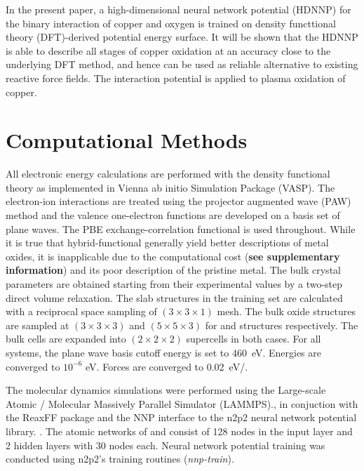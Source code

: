\message{ !name(paper.tex)}\documentclass[manuscript=cmatex]{achemso}
\begin{document}


In the present paper, a high-dimensional neural network potential (HDNNP) for the binary interaction of copper and oxygen is trained on density functtional theory (DFT)-derived potential energy surface. It will be shown that the HDNNP is able to describe all stages of copper oxidation at an accuracy close to the underlying DFT method, and hence can be used as reliable alternative to existing reactive force fields. The interaction potential is applied to plasma oxidation of copper.
\section{Computational Methods}
All electronic energy calculations are performed with the density functional theory as implemented in Vienna ab initio Simulation Package (VASP)\cite{VASP:1994,VASP:1996,Kresse:1996}. The electron-ion interactions are treated using the projector augmented wave (PAW) method\cite{VASP:1999} and the valence one-electron functions are developed on a basis set of plane waves. The PBE exchange-correlation functional\cite{PBE:1996} is used throughout. While it is true that hybrid-functional generally yield better descriptions of metal oxides, it is inapplicable due to the computational cost (\textbf{see supplementary information}) and its poor description of the pristine metal. The bulk crystal parameters are obtained starting from their experimental values\cite{CRC:97} by a two-step direct volume relaxation. The slab structures in the training set are calculated with a reciprocal space sampling of $(3\times3\times1)$ mesh. The bulk oxide structures are sampled at $(3\times3\times3)$ and $(5\times5\times3)$ for  and  structures respectively. The bulk cells are expanded into $(2\times2\times2)$ supercells in both cases. For all systems, the plane wave basis cutoff energy is set to \SI{460}{eV}. Energies are converged to $10^{-6}$ eV. Forces are converged to \SI{0.02}{eV/{\angstrom}}.

The molecular dynamics simulations were performed using the Large-scale Atomic / Molecular Massively Parallel Simulator (LAMMPS).\cite{thompson_lammps_2022}, in conjuction with the ReaxFF package\cite{aktulga_parallel_2012} and the NNP interface to the n2p2 neural network potential library. \cite{singraber_library-based_2019}. The atomic networks of  and  consist of 128 nodes in the input layer and 2 hidden layers with 30 nodes each. Neural network potential training was conducted using n2p2's training routines (\textit{nnp-train}).\cite{singraber_parallel_2019}
\end{document}

